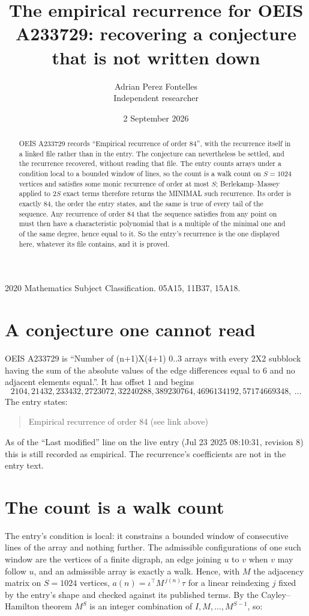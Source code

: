 \documentclass[11pt,a4paper]{article}
\title{The empirical recurrence for OEIS A233729: recovering a conjecture that is not written down}
\author{Adrian Perez Fontelles\\ \small Independent researcher}
\date{2 September 2026}
\theoremstyle{plain}
\theoremstyle{definition}
\begin{document}
\maketitle

\begin{abstract}
OEIS A233729 records ``Empirical recurrence of order $84$'', with the recurrence itself in a
linked file rather than in the entry. The conjecture can nevertheless be settled, and the
recurrence recovered, without reading that file. The entry counts arrays under a condition
local to a bounded window of lines, so the count is a walk count on $S=1024$ vertices and
satisfies some monic recurrence of order at most $S$; Berlekamp--Massey applied to $2S$ exact
terms therefore returns the MINIMAL such recurrence. Its order is exactly $84$, the order
the entry states, and the same is true of every tail of the sequence. Any recurrence of order
$84$ that the sequence satisfies from any point on must then have a characteristic
polynomial that is a multiple of the minimal one and of the same degree, hence equal to it. So
the entry's recurrence is the one displayed here, whatever its file contains, and it is
proved.
\end{abstract}

\noindent\small 2020 Mathematics Subject Classification. 05A15, 11B37, 15A18.\normalsize

\section{A conjecture one cannot read}

OEIS A233729 is ``Number of (n+1)X(4+1) 0..3 arrays with every 2X2 subblock having the sum of the absolute values of the edge differences equal to 6 and no adjacent elements equal.''. It has offset $1$ and begins
\[
2104, 21432, 233432, 2723072, 32240288, 389230764, 4696134192, 57174669348,\ \dots
\]
The entry states:
\begin{quote}
Empirical recurrence of order 84 (see link above)
\end{quote}
As of the ``Last modified'' line on the live entry (Jul 23 2025 08:10:31, revision 8) this is still
recorded as empirical. The recurrence's coefficients are not in the entry text.

\section{The count is a walk count}

The entry's condition is local: it constrains a bounded window of consecutive lines of the
array and nothing further. The admissible configurations of one such window are the vertices
of a finite digraph, an edge joining $u$ to $v$ when $v$ may follow $u$, and an admissible
array is exactly a walk. Hence, with $M$ the adjacency matrix on $S=1024$ vertices,
$a(n)=\iota^{\!\top}M^{\,j(n)}\tau$ for a linear reindexing $j$ fixed by the entry's shape
and checked against its published terms. By the Cayley--Hamilton theorem $M^{S}$ is an
integer combination of $I,M,\dots,M^{S-1}$, so:
\end{document}
